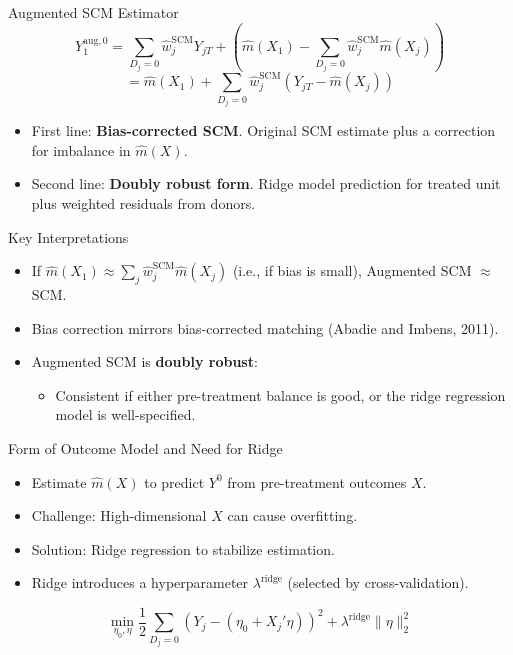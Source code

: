 \documentclass{beamer}
\begin{document}
\begin{frame}{Augmented SCM Estimator}
\small
\[
Y_1^{\text{aug},0} = \sum_{D_j=0} \widehat{w}_j^{\text{SCM}} Y_{jT} + \left( \widehat{m}(X_1) - \sum_{D_j=0} \widehat{w}_j^{\text{SCM}} \widehat{m}(X_j) \right)
\]
\[
= \widehat{m}(X_1) + \sum_{D_j=0} \widehat{w}_j^{\text{SCM}} \left( Y_{jT} - \widehat{m}(X_j) \right)
\]

\vspace{0.4cm}

\begin{itemize}
  \item First line: \textbf{Bias-corrected SCM}. Original SCM estimate plus a correction for imbalance in $\widehat{m}(X)$.
  \item Second line: \textbf{Doubly robust form}. Ridge model prediction for treated unit plus weighted residuals from donors.
\end{itemize}
\end{frame}



\begin{frame}{Key Interpretations}
\small
\begin{itemize}
  \item If $\widehat{m}(X_1) \approx \sum_j \widehat{w}_j^{\text{SCM}} \widehat{m}(X_j)$ (i.e., if bias is small), Augmented SCM $\approx$ SCM.
  \item Bias correction mirrors bias-corrected matching (Abadie and Imbens, 2011).
  \item Augmented SCM is \textbf{doubly robust}: 
  \begin{itemize}
    \item Consistent if either pre-treatment balance is good, or the ridge regression model is well-specified.
  \end{itemize}
\end{itemize}
\end{frame}


\begin{frame}{Form of Outcome Model and Need for Ridge}
\small
\begin{itemize}
  \item Estimate $\widehat{m}(X)$ to predict $Y^0$ from pre-treatment outcomes $X$.
  \item Challenge: High-dimensional $X$ can cause overfitting.
  \item Solution: Ridge regression to stabilize estimation.
  \item Ridge introduces a hyperparameter $\lambda^{\text{ridge}}$ (selected by cross-validation).
\end{itemize}
\[
\min_{\eta_0, \eta} \frac{1}{2} \sum_{D_j=0} (Y_j - (\eta_0 + X_j'\eta))^2 + \lambda^{\text{ridge}} \|\eta\|_2^2
\]
\end{frame}
\end{document}
